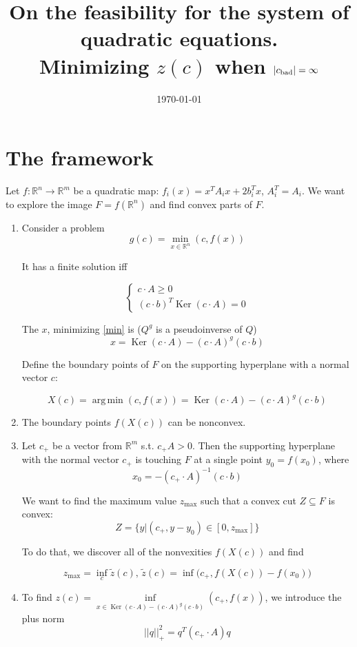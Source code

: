 \documentclass[a4paper]{article}
\date{\today}
\title{On the feasibility for the system of quadratic equations.\\Minimizing $z(c)$ when $|c_{\mathrm{bad}}|=\infty$}
\DeclareMathOperator{\Ker}{Ker}
\DeclareMathOperator*{\argmin}{arg\,min}
\begin{document}
\maketitle
\section*{The framework}
Let $f\colon\mathbb{R}^n\to\mathbb{R}^m$ be a quadratic map: $f_i(x)=x^TA_ix+2b_i^Tx$, $A_i^T=A_i$. We want to explore the image $F=f(\mathbb{R}^n)$ and find convex parts of $F$.
\begin{enumerate}
\item Consider a problem
\begin{equation}
\label{min} g(c)=\min\limits_{x\in\mathbb{R}^n}(c,f(x))
\end{equation}

It has a finite solution iff

$$
\begin{cases}c\cdot A\geqslant0\\
(c\cdot b)^T\Ker (c\cdot A)=0\end{cases}
$$

The $x$, minimizing \ref{min} is ($Q^g$ is a pseudoinverse of $Q$)
$$x=\Ker(c\cdot A)-(c\cdot A)^g(c\cdot b)$$

Define the boundary points of $F$ on the supporting hyperplane with a normal vector $c$:

$$X(c)=\argmin (c, f(x))=\Ker(c\cdot A)-(c\cdot A)^g(c\cdot b)$$


\item The boundary points $f(X(c))$ can be nonconvex.

\item Let $c_+$ be a vector from $\mathbb{R}^m$ s.t. $c_+A>0$. Then the supporting hyperplane with the normal vector $c_+$ is touching $F$ at a single point $y_0=f(x_0)$, where $$x_0=-(c_+\cdot A)^{-1}(c\cdot b)$$


We want to find the maximum value $z_{\max}$ such that a convex cut $Z\subseteq F$ is convex:
$$Z=\{y\big| (c_+,y-y_0)\in[0,z_{\max}]\}$$

To do that, we discover all of the nonvexities $f(X(c))$ and find

$$z_{\max}=\inf_c \tilde{z}(c),\, \tilde{z}(c)=\inf \big(c_+, f(X(c))-f(x_0)\big)$$


\item To find ${z}(c)=\inf\limits_{x\in \Ker(c\cdot A)-(c\cdot A)^g(c\cdot b)}(c_+,f(x))$, we introduce the plus norm
$$||q||^2_+=q^T(c_+\cdot A)q$$


\end{enumerate}
\end{document}
